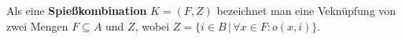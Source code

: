 \begin{definition}[Spießkombination]\label{def:spiesskomb}
Als eine \textbf{Spießkombination} $K = (F, Z)$ bezeichnet man eine Veknüpfung von zwei Mengen 
$F \subseteq A$ und $Z$, wobei $Z = \{i \in B \,|\, \forall x \in F : o(x, i)\}.$
\end{definition}
